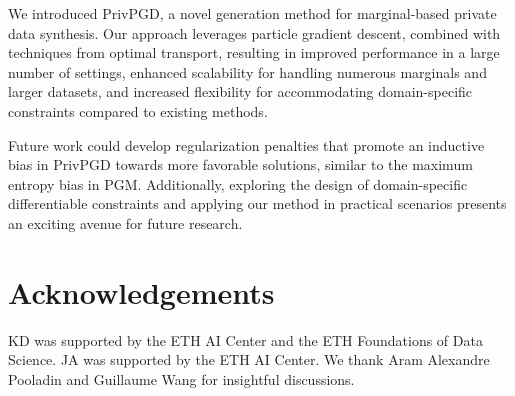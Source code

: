 We introduced PrivPGD, a novel generation method for marginal-based private data synthesis. Our approach leverages particle gradient descent, combined with techniques from optimal transport, resulting in improved performance in a large number of settings, enhanced scalability for handling numerous marginals and larger datasets, and increased flexibility for accommodating domain-specific constraints compared to existing methods.

Future work could develop regularization penalties that promote an inductive bias in PrivPGD towards more favorable solutions, similar to the maximum entropy bias in PGM. Additionally, exploring the design of domain-specific differentiable constraints and applying our method in practical scenarios presents an exciting avenue for future research.


\section{Acknowledgements}

KD was supported by the ETH AI Center and the ETH Foundations of Data Science. JA was supported by the ETH AI Center. We thank Aram Alexandre Pooladin and Guillaume Wang for insightful discussions.



